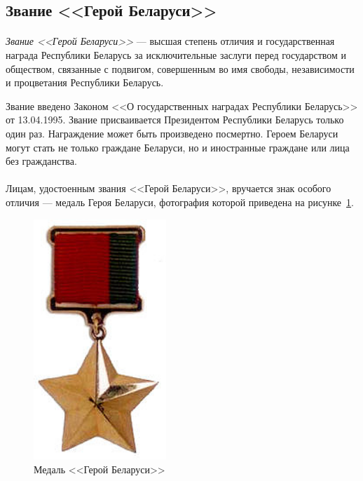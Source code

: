 \subsection{Звание <<Герой Беларуси>>}

\paragraph{}
\textit{Звание <<Герой Беларуси>>} --- высшая степень отличия и 
государственная награда Республики Беларусь за исключительные заслуги
перед государством и обществом, связанные с подвигом,
совершенным во имя свободы, независимости и процветания Республики Беларусь.

Звание введено Законом <<О государственных наградах Республики Беларусь>>
от 13.04.1995. Звание присваивается Президентом Республики Беларусь
только один раз. Награждение может быть произведено посмертно.
Героем Беларуси могут стать не только граждане Беларуси,
но и иностранные граждане или лица без гражданства.

\paragraph{}
Лицам, удостоенным звания <<Герой Беларуси>>, 
вручается знак особого отличия --- медаль Героя Беларуси,
фотография которой приведена на рисунке~\ref{fig:medal_hero_belarus}.

\begin{figure}[h]
  \centering
  \includegraphics[width=50mm]{pic/medal_hero_belarus.jpg}
  \caption{Медаль <<Герой Беларуси>>}
  \label{fig:medal_hero_belarus}
\end{figure}

